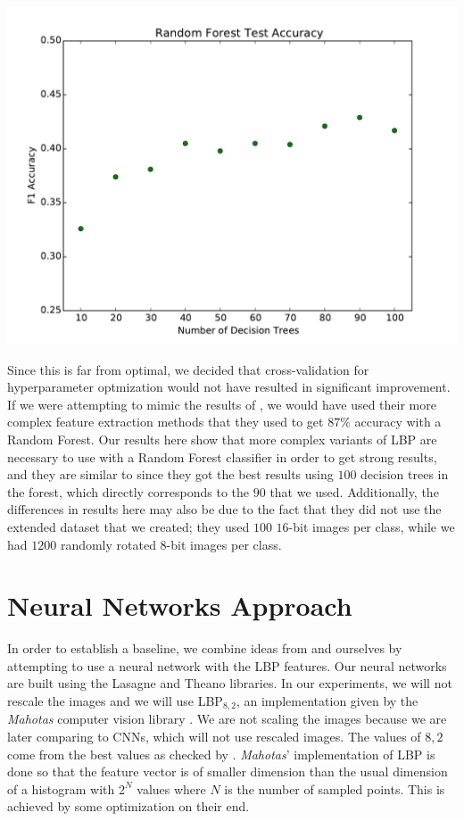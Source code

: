 \begin{multicols}{2}
\begin{Figure}
	\centering
	\includegraphics[width=1.0\linewidth]{images/random_forest_results.pdf}
	\label{fig:random_forest}
\end{Figure}

Since this is far from optimal, we decided that cross-validation for hyperparameter optmization would not have resulted in significant improvement.  If we were attempting to mimic the results of \citet{kylberg2011virus}, we would have used their more complex feature extraction methods that they used to get $87\%$ accuracy with a Random Forest. Our results here show that more complex variants of LBP are necessary to use with a Random Forest classifier in order to get strong results, and they are similar to \citet{kylberg2011virus} since they got the best results using $100$ decision trees in the forest, which directly corresponds to the $90$ that we used. Additionally, the differences in results here may also be due to the fact that they did not use the extended dataset that we created; they used $100$ $16$-bit images per class, while we had $1200$ randomly rotated $8$-bit images per class.

\section{Neural Networks Approach}
In order to establish a baseline, we combine ideas from \citet{kylberg2011virus} and ourselves by attempting to use a neural network with the LBP features. Our neural networks are built using the Lasagne and Theano \citet{Bastien-Theano-2012, bergstra+al:2010-scipy} libraries. In our experiments, we will not rescale the images and we will use LBP$_{8,2}$, an implementation given by the \emph{Mahotas} computer vision library \citet{coelho2012mahotas}. We are not scaling the images because we are later comparing to CNNs, which will not use rescaled images. The values of $8,2$ come from the best values as checked by \citet{kylberg2011virus}. \emph{Mahotas}' implementation of LBP is done so that the feature vector is of smaller dimension than the usual dimension of a histogram with $2^N$ values where $N$ is the number of sampled points. This is achieved by some optimization on their end. 

\end{multicols}
